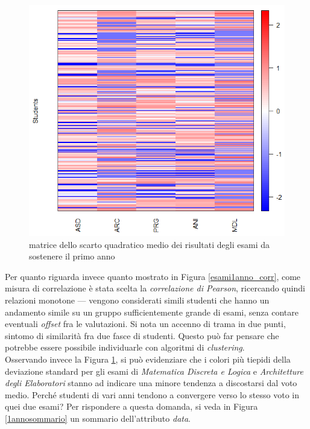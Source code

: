                 \begin{figure}
                    \centering
                    \caption{matrice dello scarto quadratico medio dei risultati degli esami da sostenere il primo anno}
                    \label{esami1anno_stddev}
                	\includegraphics[scale=0.60]{img/std_dev_matrix_1.png}
                \end{figure}

                Per quanto riguarda invece quanto mostrato in Figura \ref{esami1anno_corr}, come misura di correlazione è stata scelta la \textit{correlazione di Pearson}, ricercando quindi relazioni monotone --- vengono considerati simili studenti che hanno un andamento simile su un gruppo sufficientemente grande di esami, senza contare eventuali \textit{offset} fra le valutazioni. Si nota un accenno di trama in due punti, sintomo di similarità fra due fasce di studenti. Questo può far pensare che potrebbe essere possibile individuarle con algoritmi di \textit{clustering}. \\

                Osservando invece la Figura \ref{esami1anno_stddev}, si può evidenziare che i colori più tiepidi della deviazione standard per gli esami di \textit{Matematica Discreta e Logica} e \textit{Architetture degli Elaboratori} stanno ad indicare una minore tendenza a discostarsi dal voto medio. Perché studenti di vari anni tendono a convergere verso lo stesso voto in quei due esami? Per rispondere a questa domanda, si veda in Figura \ref{1annosommario} un sommario dell'attributo \textit{data}. \\

